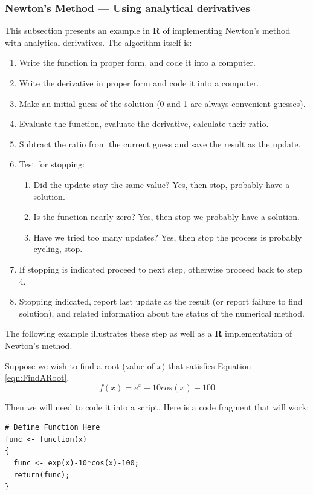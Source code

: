 \subsubsection{Newton's Method --- Using analytical derivatives}
This subsection presents an example in \textbf{R} of implementing Newton's method with analytical derivatives.   
The algorithm itself is:
\begin{enumerate}
\item Write the function in proper form, and code it into a computer.
\item Write the derivative in proper form and code it into a computer.
\item Make an initial guess of the solution (0 and 1 are always convenient guesses).
\item Evaluate the function, evaluate the derivative, calculate their ratio.
\item Subtract the ratio from the current guess and save the result as the update.
\item Test for stopping:
\begin{enumerate}
\item Did the update stay the same value? Yes, then stop, probably have a solution.
\item Is the function nearly zero?  Yes, then stop we probably have a solution.
\item Have we tried too many updates? Yes, then stop the process is probably cycling, stop.
\end{enumerate}
\item If stopping is indicated proceed to next step, otherwise proceed back to step 4.
\item Stopping indicated, report last update as the result (or report failure to find solution), and related information about the status of the numerical method.
\end{enumerate}

The following example illustrates these step as well as a \textbf{R} implementation of Newton's method.

Suppose we wish to find a root (value of $x$) that satisfies Equation \ref{eqn:FindARoot}.
\begin{equation}
f(x) = e^x - 10 cos(x) -100
\label{eqn:FindARoot}
\end{equation}

Then we will need to code it into a script.   Here is a code fragment that will work:
\begin{lstlisting}[caption=R code fragment for the function calculation, label=lst:NewtonsFunction]
# Define Function Here
func <- function(x)
{
  func <- exp(x)-10*cos(x)-100;
  return(func);
}
\end{lstlisting}

